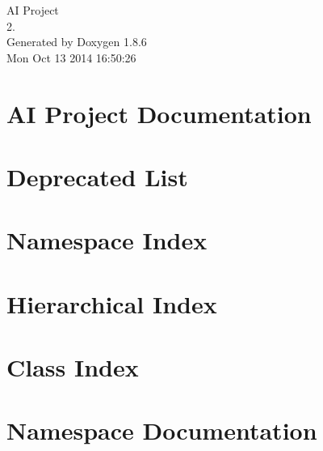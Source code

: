\documentclass[twoside]{book}
\newcommand{\clearemptydoublepage}{%
  \newpage{\pagestyle{empty}\cleardoublepage}%
}
\begin{document}
\hypersetup{pageanchor=false}
\begin{titlepage}
\vspace*{7cm}
\begin{center}%
{\Large A\-I Project \\[1ex]\large 2. }\\
\vspace*{1cm}
{\large Generated by Doxygen 1.8.6}\\
\vspace*{0.5cm}
{\small Mon Oct 13 2014 16:50:26}\\
\end{center}
\end{titlepage}
\clearemptydoublepage
\tableofcontents
\clearemptydoublepage
{}
\hypersetup{pageanchor=true}

\chapter{A\-I Project Documentation}
\label{index}\hypertarget{index}{}
\chapter{Deprecated List}
\label{deprecated}
\hypertarget{deprecated}{}

\chapter{Namespace Index}

\chapter{Hierarchical Index}

\chapter{Class Index}

\chapter{Namespace Documentation}

\end{document}
